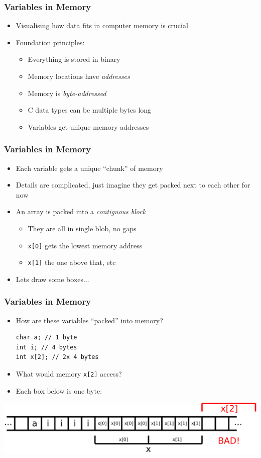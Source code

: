 \documentclass[14pt]{beamer}
\begin{document}
\begin{frame}
\frametitle{Variables in Memory}
\begin{itemize}
\item Visualising how data fits in computer memory is crucial
\item Foundation principles:
	\begin{itemize}
		\item Everything is stored in binary
		\item Memory locations have \textit{addresses}
		\item Memory is \textit{byte-addressed}
		\item C data types can be multiple bytes long
		\item Variables get unique memory addresses
	\end{itemize}

\end{itemize}
\end{frame}

\begin{frame}
\frametitle{Variables in Memory}
\begin{itemize}
\item Each variable gets a unique ``chunk'' of memory
\item Details are complicated, just imagine they get packed next to each other for now
\item An array is packed into a \textit{contiguous block}
	\begin{itemize}
		\item They are all in single blob, no gaps
		\item \texttt{x[0]} gets the lowest memory address
		\item \texttt{x[1]} the one above that, etc
	\end{itemize}
\item Lets draw some boxes...
\end{itemize}
\end{frame}

\begin{frame}[fragile]
\frametitle{Variables in Memory}
\begin{itemize}
\item How are these variables ``packed'' into memory?
\begin{lstlisting}[style=CStyle]
char a; // 1 byte
int i; // 4 bytes
int x[2]; // 2x 4 bytes
\end{lstlisting}
\pause
\item What would memory \texttt{x[2]} access?
\pause
\item Each box below is one byte:
\end{itemize}
\includegraphics[width=\textwidth]{memory}
\end{frame}
\end{document}

